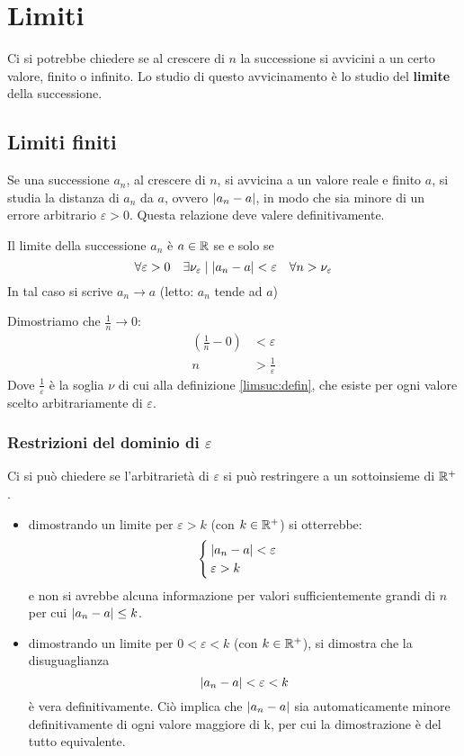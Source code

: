 \section{Limiti}
Ci si potrebbe chiedere se al crescere di $n$ la successione si avvicini a un certo valore, finito o infinito. Lo studio di questo avvicinamento è lo studio del \textbf{limite} della successione.


\subsection{Limiti finiti}
Se una successione $a_n$, al crescere di $n$, si avvicina a un valore reale e finito $a$, si studia la distanza di $a_n$ da $a$, ovvero $\left\lvert a_n-a \right\rvert$, in modo che sia minore di un errore arbitrario $\varepsilon>0$. Questa relazione deve valere definitivamente.
\begin{defin}
	Il limite della successione $a_n$ è $a\in\mathbb{R}$ se e solo se
	\label{limsuc:defin}
	\[
		\forall\varepsilon>0\quad\exists\nu_\varepsilon\mid\left\lvert a_n-a \right\rvert<\varepsilon\quad\forall n>\nu_\varepsilon
	\]
	In tal caso si scrive $a_n\to a$ (letto: $a_n$ tende ad $a$)
\end{defin}

\begin{examp}
	Dimostriamo che $\frac{1}{n}\to 0$:
	\begin{align*}
		(\frac{1}{n}-0) & <\varepsilon           \\
		n               & >\frac{1}{\varepsilon}
	\end{align*}
	Dove $\frac{1}{\varepsilon}$ è la soglia $\nu$ di cui alla definizione \ref{limsuc:defin}, che esiste per ogni valore scelto arbitrariamente di $\varepsilon$.
\end{examp}

\subsubsection{Restrizioni del dominio di $\varepsilon$}
Ci si può chiedere se l'arbitrarietà di $\varepsilon$ si può restringere a un sottoinsieme di $\mathbb{R}^+$.
\begin{itemize}
	\item dimostrando un limite per $\varepsilon>k$ (con $k\in\mathbb{R}^+$) si otterrebbe:
	      \[
		      \begin{cases}
			      \left\lvert a_n-a \right\rvert<\varepsilon \\
			      \varepsilon>k
		      \end{cases}
	      \]
	      e non si avrebbe alcuna informazione per valori sufficientemente grandi di $n$ per cui $\left\lvert a_n-a \right\rvert\leq k$.
	\item dimostrando un limite per $0<\varepsilon<k$ (con $k\in\mathbb{R}^+$), si dimostra che la disuguaglianza
	      \[
		      \left\lvert a_n-a \right\rvert<\varepsilon<k
	      \]
	      è vera definitivamente. Ciò implica che $\left\lvert a_n-a \right\rvert$ sia automaticamente minore definitivamente di ogni valore maggiore di k, per cui la dimostrazione è del tutto equivalente.
\end{itemize}

